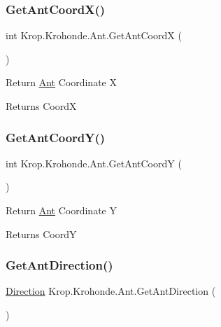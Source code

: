 \subsubsection{\texorpdfstring{Get\+Ant\+Coord\+X()}{GetAntCoordX()}}
{\footnotesize\ttfamily int Krop.\+Krohonde.\+Ant.\+Get\+Ant\+CoordX (\begin{DoxyParamCaption}{ }\end{DoxyParamCaption})}



Return \mbox{\hyperlink{class_krop_1_1_krohonde_1_1_ant}{Ant}} Coordinate X 

\begin{DoxyReturn}{Returns}
CoordX
\end{DoxyReturn}
\mbox{\label{class_krop_1_1_krohonde_1_1_ant_a5b7e4c09838cd96cf1a37b804670e4c5}} 
\subsubsection{\texorpdfstring{Get\+Ant\+Coord\+Y()}{GetAntCoordY()}}
{\footnotesize\ttfamily int Krop.\+Krohonde.\+Ant.\+Get\+Ant\+CoordY (\begin{DoxyParamCaption}{ }\end{DoxyParamCaption})}



Return \mbox{\hyperlink{class_krop_1_1_krohonde_1_1_ant}{Ant}} Coordinate Y 

\begin{DoxyReturn}{Returns}
CoordY
\end{DoxyReturn}
\mbox{\label{class_krop_1_1_krohonde_1_1_ant_a71d8ba38c51d6b9e415a61185295b3da}} 
\subsubsection{\texorpdfstring{Get\+Ant\+Direction()}{GetAntDirection()}}
{\footnotesize\ttfamily \mbox{\hyperlink{namespace_krop_1_1_krohonde_a846d88876d5263c1530b67322bacd896}{Direction}} Krop.\+Krohonde.\+Ant.\+Get\+Ant\+Direction (\begin{DoxyParamCaption}{ }\end{DoxyParamCaption})}



